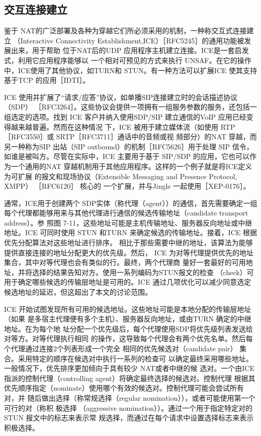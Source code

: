 \subsection{交互连接建立}

鉴于 NAT的广泛部署及各种为穿越它们所必须采用的机制，一种称交互式连接建立
（Interactive Connectivity Establishment,ICE）［RFC5245］的通用功能被发展出来，用于帮助
位于NAT后的UDP 应用程序主机建立连接。ICE是一套启发式，利用它应用程序能够以
一个相对可预见的方式来执行 UNSAF。在它的操作中，ICE使用了其他协议，如TURN和
STUN。有一种方法可以扩展ICE 使其支持基于TCP 的应用［IDTI］。

ICE 使用并扩展了“请求/应答”协议，如单播SIP连接建立时的会话描述协议（SDP）
［RFC3264］。这些协议会提供一项拥有一组服务参数的服务，还包括一组选定的选项。找到
ICE 客户并纳入使用SDP/SIP 建立通信的VoIP 应用已经变得越来越普遍。然而在这种情况
下，ICE 被用于建立媒体流（如使用 RTP［RFC3550］或 SRTP［RFC3711］通话中的音频或视
频部分）的NAT 穿越，而另一种称为SIP 出站（SIP outbound）的机制［RFC5626］用于处理
SIP 信令，如谁是被叫方。尽管在实际中，ICE 主要用于基于 SIP/SDP 的应用，它也可以作
为一个通用的NAT 穿越机制用于其他应用程序。这样的一个例子就是将ICE定义为可扩展
的报文和现场协议（Extensible Messaging and Presence Protocol, XMPP） ［RFC6120］ 核心的
一个扩展，并与Jingle 一起使用［XEP-0176］。

通常，ICE用于创建两个 SDP实体（称代理（agent））的通信，首先需要确定一组
每个代理都能够用来与其他代理进行通信的候选传输地址（candidate transport address）。参
照图 7-11，这些地址可能是主机传输地址、服务器反向地址或中继地址。ICE 可同时使用
STUN 和TURN 来确定候选的传输地址。接着，ICE 根据优先分配算法对这些地址进行排序。
相比于那些需要中继的地址，该算法为能够提供直接连接的地址分配更大的优先级。然后，
ICE 为对等代理提供优先的地址集合，其中对等代理也会有类似的行。最终，两个代理商
量好一套最好的可用地址，并将选择的结果告知对方。使用一系列编码为STUN报文的检查
（check）可用于确定哪些候选的传输层地址是可用的。ICE 通过几项优化可以减少同意选定
候选地址的延迟，但这超出了本文的讨论范围。

ICE 开始试图发现所有可用的候选地址。这些地址可能是本地分配的传输层地址（如果
是多宿主代理便有多个主机）、服务器反向地址，或由TURN 确定的中继地址。在为每个地
址分配一个优先级后，每个代理使用SDP将优先级列表发送给对等方。对等代理执行相同
的操作，这导致每个代理会有两个优先名单。然后每个代理通过连接2个列表形成一个完全
相同的优先候选对（candidate pair） 集合。采用特定的顺序在候选对中执行一系列的检查可
以确定最终采用哪些地址。一般情况下，优先排序更加倾向于具有较少 NAT或者中继的候
选对。一个由ICE 指派的控制代理（controlling agent）将确定最终选择的候选对。控制代理
根据其优先顺序指定（nominate）使用哪个有效的候选对。控制代理可能会尝试所有对，并
随后做出选择（称常规选择（regular nomination）），或者可能使用第一个可行的对（称积
极选择 （aggressive nomination））。通过一个用于指定特定对的STUN 报文中的标志来表示常
规选择，而通过在每个请求中设置选择标志来表示积极选择。

